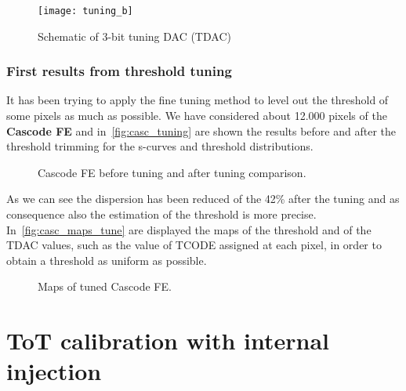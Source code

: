 \begin{figure}
\centering
\texttt{[image: tuning\_b]}
\caption{Schematic of 3-bit tuning DAC (TDAC)}
\label{fig:tdac}
\end{figure}


\subsubsection{First results from threshold tuning}

It has been trying to apply the fine tuning method to level out the threshold of some pixels as much as possible. We have considered about 12.000 pixels of the \textbf{Cascode FE} and in~\autoref{fig:casc_tuning} are shown the results before and after the threshold trimming for the s-curves and threshold distributions.


\begin{figure}[h!]
\centering
{}\quad
{}\quad
{}\quad
\caption{Cascode FE before tuning and after tuning comparison.}
\label{fig:casc_tuning}
\end{figure}

As we can see the dispersion has been reduced of the 42\% after the tuning and as consequence also the estimation of the threshold is more precise. In~\autoref{fig:casc_maps_tune} are displayed the maps of the threshold and of the TDAC values, such as the value of TCODE assigned at each pixel, in order to obtain a threshold as uniform as possible. \\

\begin{figure}[h!]
\centering
{}\quad
{}\quad
\caption{Maps of tuned Cascode FE.}
\label{fig:casc_maps_tune}
\end{figure}


\section{ToT calibration with internal injection}


